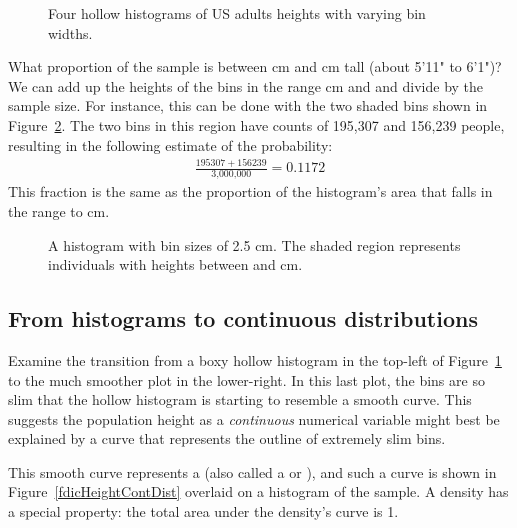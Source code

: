 \begin{figure}[ht]
  \centering
  \caption{Four hollow histograms of US adults heights
      with varying bin widths.}
  \label{fdicHistograms}
\end{figure}

\begin{examplewrap}
\begin{nexample}{What proportion of the sample is between  cm and  cm tall (about 5'11" to 6'1")?}\label{contDistProb}
We can add up the heights of the bins in the range  cm and  and divide by the sample size. For instance, this can be done with the two shaded bins shown in Figure~\ref{usHeightsHist180185}. The two bins in this region have counts of 195,307 and 156,239 people, resulting in the following estimate of the probability:
\begin{align*}
\frac{195307 + 156239}{\text{3,000,000}} = 0.1172
\end{align*}
This fraction is the same as the proportion of the histogram's area that falls in the range  to  cm.
\end{nexample}
\end{examplewrap}

\begin{figure}
  \centering
  \caption{A histogram with bin sizes of 2.5 cm.
      The shaded region represents individuals with
      heights between  and  cm.}
  \label{usHeightsHist180185}
\end{figure}


\subsection{From histograms to continuous distributions}

Examine the transition from a boxy hollow histogram in the top-left of Figure~\ref{fdicHistograms} to the much smoother plot in the lower-right. In this last plot, the bins are so slim that the hollow histogram is starting to resemble a smooth curve. This suggests the population height as a \emph{continuous} numerical variable might best be explained by a curve that represents the outline of extremely slim bins.

This smooth curve represents a  (also called a  or ), and such a curve is shown in Figure~\ref{fdicHeightContDist} overlaid on a histogram of the sample. A density has a special property: the total area under the density's curve is 1. 

